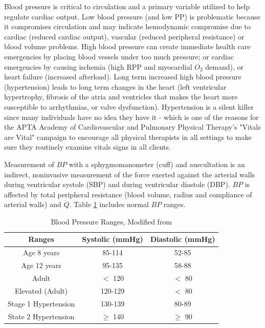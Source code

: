 Blood pressure is critical to circulation and a primary variable utilized to help regulate cardiac output. Low blood pressure (and low PP) is problematic because it compromises circulation and may indicate hemodynamic compromise due to cardiac (reduced cardiac output), vascular (reduced peripheral resistance) or blood volume problems. High blood pressure can create immediate health care emergencies by placing blood vessels under too much pressure; or cardiac emergencies by causing ischemia (high RPP and myocardial $O_2$ demand), or heart failure (increased afterload). Long term increased high blood pressure (hypertension) leads to long term changes in the heart (left ventricular hypertrophy, fibrosis of the atria and ventricles that makes the heart more susceptible to arrhythmias, or valve dysfunction). Hypertension is a silent killer since many individuals have no idea they have it - which is one of the reasons for the APTA Academy of Cardiovascular and Pulmonary Physical Therapy's "Vitals are Vital" campaign to encourage all physical therapists in all settings to make sure they routinely examine vitals signs in all clients.

Measurement of $BP$ with a sphygmomanometer (cuff) and auscultation is an indirect, noninvasive measurement of the force exerted against the arterial walls during ventricular systole (SBP) and during ventricular diastole (DBP). $BP$ is affected by total peripheral resistance (blood volume, radius and compliance of arterial walls) and $\dot{Q}$. Table \ref{table:BP_Ranges} includes normal $BP$ ranges. 

\begin{table}[h!]
\centering
\begin{tabular}{||c c c ||} 
 \hline
 Ranges & Systolic (mmHg) & Diastolic (mmHg) \\ [0.5ex] 
 \hline\hline
Age 8 years & 85-114  & 52-85  \\ 
Age 12 years & 95-135  & 58-88   \\
Adult & $<$ 120   & $<$ 80   \\
Elevated (Adult) & 120-129   & $<$ 80  \\
Stage 1 Hypertension & 130-139  & 80-89   \\
State 2 Hypertension & $\geq$ 140 &  $\geq$ 90 \\ [1ex] 
 \hline
\end{tabular}
\caption{Blood Pressure Ranges, Modified from \cite{collins_cardiac_2019}}
\label{table:BP_Ranges}
\end{table}

